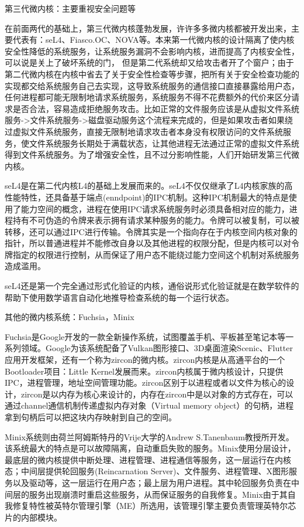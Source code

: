\documentclass[utf8]{book}
\begin{document}
{\large 第三代微内核：主要重视安全问题等}

在前面两代的基础上，第三代微内核蓬勃发展，许许多多微内核都被开发出来，主要代表有：seL4、Fiasco.OC、NOVA等。本来第一代微内核的设计隔离了使内核安全性降低的系统服务，让系统服务漏洞不会影响内核，进而提高了内核安全性，可以说是关上了破坏系统的门， 但是第二代系统却又给攻击者开了个窗户；由于第二代微内核在内核中省去了关于安全性检查等步骤，把所有关于安全检查功能的实现都交给系统服务自己去实现，这导致系统服务的通信接口直接暴露给用户态，任何进程都可能无限制地请求系统服务，系统服务不得不花费额外的代价来区分请求是否合法，容易造成拒绝服务攻击。比如正常的文件服务应该是从虚拟文件系统服务->文件系统服务->磁盘驱动服务这个流程来完成的，但是如果攻击者如果绕过虚拟文件系统服务，直接无限制地请求攻击者本身没有权限访问的文件系统服务，使文件系统服务长期处于满载状态，让其他进程无法通过正常的虚拟文件系统得到文件系统服务。为了增强安全性，且不过分影响性能，人们开始研发第三代微内核。

seL4是在第二代内核L4的基础上发展而来的。seL4不仅仅继承了L4内核家族的高性能特性，还具备基于端点(enndpoint)的IPC机制。这种IPC机制最大的特点是使用了能力空间的概念，进程在使用IPC请求系统服务时必须具备相对应的能力，进程持有不可伪造的令牌来表示拥有请求某种服务的能力。令牌可以被复制，可以被转移，还可以通过IPC进行传输。令牌其实是一个指向存在于内核空间内核对象的指针，所以普通进程并不能修改自身以及其他进程的权限分配，但是内核可以对令牌指定的权限进行控制，从而保证了用户态不能绕过能力空间这个机制对系统服务造成滥用。

seL4还是第一个完全通过形式化验证的内核，通俗说形式化验证就是在数学软件的帮助下使用数学语言自动化地推导检查系统的每一个运行状态。

{\large 其他的微内核系统：Fuchsia，Minix}

Fuchsia是Google开发的一款全新操作系统，试图覆盖手机、平板甚至笔记本等一系列领域。Google为该系统配备了Vulkan图形接口、3D桌面渲染Scenic、Flutter应用开发框架，还有一个称为zircon的微内核。zircon内核是从高通平台的一个Bootloader项目：Little Kernel发展而来。zircon内核属于微内核设计，只提供IPC，进程管理，地址空间管理功能。zircon区别于以进程或者以文件为核心的设计，zircon是以内存为核心来设计的，内存在zircon中是以对象的方式存在，可以通过channel通信机制传递虚拟内存对象（Virtual memory object）的句柄，进程拿到句柄后可以把这块内存映射到自己的空间。

Minix系统则由荷兰阿姆斯特丹的Vrije大学的Andrew S.Tanenbaum教授所开发。该系统最大的特点是可以故障隔离，自动重启失败的服务。Minix使用分层设计，最底层的微内核提供中断处理、进程管理、进程通信等服务，这一层运行在内核态；中间层提供轮回服务(Reincarnation Server)、文件服务、进程管理、X图形服务以及驱动等，这一层运行在用户态；最上层为用户进程。其中轮回服务负责在中间层的服务出现崩溃时重启这些服务，从而保证服务的自我修复。Minix由于其自我修复特性被英特尔管理引擎（ME）所选用，该管理引擎主要负责管理英特尔芯片的内部模块。
\end{document}
